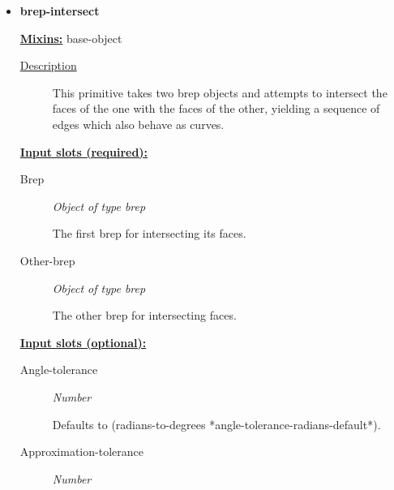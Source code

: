 \documentclass [11pt]{book}
\begin{document}
\begin{itemize}
\item {}
\label{prim:brep-intersect}
\textbf{brep-intersect}


\textbf{
\underline{Mixins:}} base-object





\begin{description}

\item [
\underline{Description}]


This primitive takes two brep objects and attempts
to intersect the faces of the one with the faces of the other, yielding a 
sequence of edges which also behave as curves.



\end{description}








\textbf{
\underline{Input slots (required):}}

\begin{description}

\item [Brep]
\emph{Object of type brep}

 The first brep for intersecting its faces.




\item [Other-brep]
\emph{Object of type brep}

 The other brep for intersecting faces.




\end{description}






\textbf{
\underline{Input slots (optional):}}

\begin{description}

\item [Angle-tolerance]
\emph{Number}

 Defaults to (radians-to-degrees *angle-tolerance-radians-default*).




\item [Approximation-tolerance]
\emph{Number}


\end{description}
\end{itemize}
\end{document}
